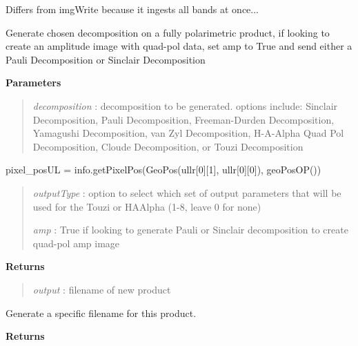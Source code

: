 \documentclass[letterpaper,10pt,openany,oneside]{sphinxmanual}
\begin{document}
\begin{fulllineitems}
\begin{fulllineitems}
Differs from imgWrite because it ingests all bands at once...

\end{fulllineitems}


\begin{fulllineitems}
\label{code:Image.Image.decomposition_generation}
Generate chosen decomposition on a fully polarimetric product, if looking to create an amplitude image with quad-pol data, set amp to True
and send either a Pauli Decomposition or Sinclair Decomposition

\textbf{Parameters}
\begin{quote}

\emph{decomposition} : decomposition to be generated. options include: Sinclair Decomposition, Pauli Decomposition, Freeman-Durden Decomposition, Yamagushi Decomposition, van Zyl Decomposition, H-A-Alpha Quad Pol Decomposition, Cloude Decomposition, or Touzi Decomposition
\end{quote}

pixel\_posUL = info.getPixelPos(GeoPos(ullr{[}0{]}{[}1{]}, ullr{[}0{]}{[}0{]}), geoPosOP())
\begin{quote}

\emph{outputType} : option to select which set of output parameters that will be used for the Touzi or HAAlpha (1-8, leave 0 for none)

\emph{amp} : True if looking to generate Pauli or Sinclair decomposition to create quad-pol amp image
\end{quote}

\textbf{Returns}
\begin{quote}

\emph{output} : filename of new product
\end{quote}

\end{fulllineitems}


\begin{fulllineitems}
\label{code:Image.Image.fnameGenerate}
Generate a specific filename for this product.

\textbf{Returns}
\begin{quote}


\end{quote}
\end{fulllineitems}
\end{fulllineitems}
\end{document}

